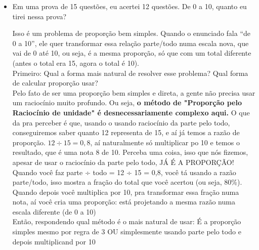 \documentclass{article}
\begin{document}
\begin{itemize}
    \item Em uma prova de 15 questões, eu acertei 12 questões. De 0 a 10, quanto eu tirei nessa prova?
    
    Isso é um problema de proporção bem simples. Quando o enunciado fala “de 0 a 10”, ele quer transformar essa relação parte/todo numa escala nova, que vai de 0 até 10, ou seja, é a mesma proporção, só que com um total diferente (antes o total era 15, agora o total é 10).
    \\[5pt]
    Primeiro: Qual a forma mais natural de resolver esse problema? Qual forma de calcular proporção usar?
    \\[5pt]
    Pelo fato de ser uma proporção bem simples e direta, a gente não precisa usar um raciocínio muito profundo. Ou seja, \textbf{o método de "Proporção pelo Raciocínio de unidade" é desnecessariamente complexo aqui.} O que da pra perceber é que, usando o usando raciocínio da parte pelo todo, conseguiremos saber quanto 12 representa de 15, e aí já temos a razão de proporção. $12\div15=0,8$, aí naturalmente só multiplicar po 10 e temos o resultado, que é uma nota 8 de 10. Perceba uma coisa, isso que nós fizemos, apesar de usar o raciocínio da parte pelo todo, JÁ É A PROPORÇÃO! Quando você faz parte ÷ todo = 12 ÷ 15 = 0,8, você tá usando a razão parte/todo, isso mostra a fração do total que você acertou (ou seja, 80\%). Quando depois você multiplica por 10, pra transformar essa fração numa nota, aí você cria uma proporção: está projetando a mesma razão numa escala diferente (de 0 a 10)
    \\[5pt]
    Então, respondendo qual método é o mais natural de usar: É a proporção simples mesmo por regra de 3 OU simplesmente usando parte pelo todo e depois multiplicand por 10


\end{itemize}
\end{document}

